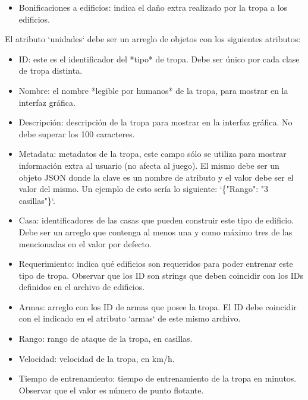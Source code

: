 \documentclass[titlepage,a4paper,12pt]{article}
\begin{document}
\begin{itemize}
\begin{itemize}
\item Bonificaciones a edificios: indica el daño extra realizado por la tropa a los edificios.

\end{itemize}

El atributo `unidades` debe ser un arreglo de objetos con los siguientes atributos:  

\begin{itemize}

\item ID: este es el identificador del *tipo* de tropa. Debe ser único por cada clase de tropa distinta.

\item Nombre: el nombre *legible por humanos* de la tropa, para mostrar en la interfaz gráfica.

\item Descripción: descripción de la tropa para mostrar en la interfaz gráfica. No debe superar los 100 caracteres.

\item Metadata: metadatos de la tropa, este campo sólo se utiliza para mostrar información extra al usuario (no afecta al juego). El mismo debe ser un objeto JSON donde la clave es un nombre de atributo y el valor debe ser el valor del mismo. Un ejemplo de esto sería lo siguiente: `\{"Rango": "3 casillas"\}`.

\item Casa: identificadores de las casas que pueden construir este tipo de edificio. Debe ser un arreglo que contenga al menos una y como máximo tres de las mencionadas en el valor por defecto. 

\item Requerimiento: indica qué edificios son requeridos para poder entrenar este tipo de tropa. Observar que los ID son strings que deben coincidir con los IDs definidos en el archivo de edificios.

\item Armas: arreglo con los ID de armas que posee la tropa. El ID debe coincidir con el indicado en el atributo `armas` de este mismo archivo.

\item Rango: rango de ataque de la tropa, en casillas.

\item Velocidad: velocidad de la tropa, en km/h.

\item Tiempo de entrenamiento: tiempo de entrenamiento de la tropa en minutos. Observar que el valor es número de punto flotante.


\end{itemize}
\end{itemize}
\end{document}
